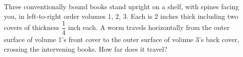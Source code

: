 Three conventionally bound books stand upright on a shelf, with spines facing you, in left-to-right order volumes 1, 2, 3. Each is $2$ inches thick including two covers of thickness $\dfrac{1}{4}$ inch each. A worm travels horizontally from the outer surface of volume 1's front cover to the outer surface of volume 3's back cover, crossing the intervening books. How far does it travel?
